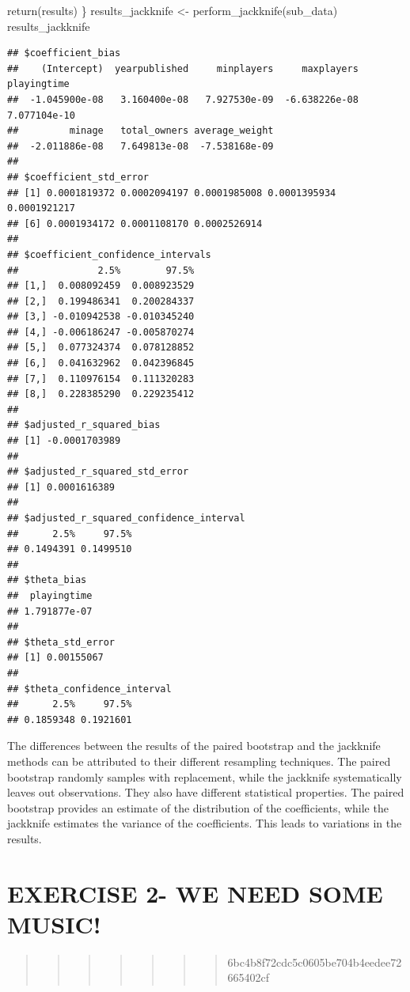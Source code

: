 \documentclass[
]{article}
\newenvironment{Shaded}{\begin{snugshade}}{\end{snugshade}}
\newcommand{\FunctionTok}[1]{\textcolor[rgb]{0.00,0.00,0.00}{#1}}
\newcommand{\NormalTok}[1]{#1}
\newcommand{\OtherTok}[1]{\textcolor[rgb]{0.56,0.35,0.01}{#1}}
\begin{document}
\begin{Shaded}
\begin{Highlighting}[]
  \FunctionTok{return}\NormalTok{(results)}
\NormalTok{\}}
\NormalTok{results\_jackknife }\OtherTok{\textless{}{-}} \FunctionTok{perform\_jackknife}\NormalTok{(sub\_data)}
\NormalTok{results\_jackknife}
\end{Highlighting}
\end{Shaded}

\begin{verbatim}
## $coefficient_bias
##    (Intercept)  yearpublished     minplayers     maxplayers    playingtime 
##  -1.045900e-08   3.160400e-08   7.927530e-09  -6.638226e-08   7.077104e-10 
##         minage   total_owners average_weight 
##  -2.011886e-08   7.649813e-08  -7.538168e-09 
## 
## $coefficient_std_error
## [1] 0.0001819372 0.0002094197 0.0001985008 0.0001395934 0.0001921217
## [6] 0.0001934172 0.0001108170 0.0002526914
## 
## $coefficient_confidence_intervals
##              2.5%        97.5%
## [1,]  0.008092459  0.008923529
## [2,]  0.199486341  0.200284337
## [3,] -0.010942538 -0.010345240
## [4,] -0.006186247 -0.005870274
## [5,]  0.077324374  0.078128852
## [6,]  0.041632962  0.042396845
## [7,]  0.110976154  0.111320283
## [8,]  0.228385290  0.229235412
## 
## $adjusted_r_squared_bias
## [1] -0.0001703989
## 
## $adjusted_r_squared_std_error
## [1] 0.0001616389
## 
## $adjusted_r_squared_confidence_interval
##      2.5%     97.5% 
## 0.1494391 0.1499510 
## 
## $theta_bias
##  playingtime 
## 1.791877e-07 
## 
## $theta_std_error
## [1] 0.00155067
## 
## $theta_confidence_interval
##      2.5%     97.5% 
## 0.1859348 0.1921601
\end{verbatim}

The differences between the results of the paired bootstrap and the
jackknife methods can be attributed to their different resampling
techniques. The paired bootstrap randomly samples with replacement,
while the jackknife systematically leaves out observations. They also
have different statistical properties. The paired bootstrap provides an
estimate of the distribution of the coefficients, while the jackknife
estimates the variance of the coefficients. This leads to variations in
the results.

\hypertarget{exercise-2--we-need-some-music}{%
\section{EXERCISE 2- WE NEED SOME
MUSIC!}\label{exercise-2--we-need-some-music}}

\begin{quote}
\begin{quote}
\begin{quote}
\begin{quote}
\begin{quote}
\begin{quote}
\begin{quote}
6bc4b8f72cdc5c0605be704b4eedee72665402cf
\end{quote}
\end{quote}
\end{quote}
\end{quote}
\end{quote}
\end{quote}
\end{quote}
\end{document}
